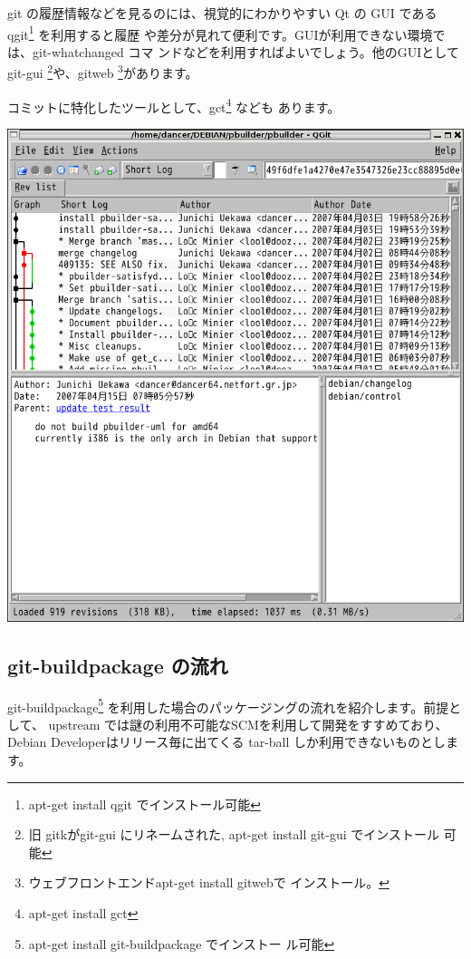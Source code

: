 \documentclass[mingoth,a4paper]{jsarticle}
\begin{document}
\begin{minipage}[b]{0.5\hsize}
git の履歴情報などを見るのには、視覚的にわかりやすい Qt の GUI である 
 qgit\footnote{apt-get install qgit でインストール可能} を利用すると履歴
 や差分が見れて便利です。GUIが利用できない環境では、git-whatchanged コマ
 ンドなどを利用すればよいでしょう。他のGUIとして git-gui \footnote{旧
 gitkがgit-gui にリネームされた, apt-get install git-gui でインストール
 可能}や、gitweb \footnote{ウェブフロントエンドapt-get install gitwebで
 インストール。}があります。

コミットに特化したツールとして、gct\footnote{apt-get install gct} なども
 あります。

\end{minipage}
\begin{minipage}[c]{0.5\hsize}
\includegraphics[width=0.8\hsize]{image200704/qgit.png}
\end{minipage}

\subsection{git-buildpackage の流れ}

git-buildpackage\footnote{apt-get install git-buildpackage でインストー
ル可能} を利用した場合のパッケージングの流れを紹介します。前提として、 
upstream では謎の利用不可能なSCMを利用して開発をすすめており、Debian
Developerはリリース毎に出てくる tar-ball しか利用できないものとします。
\end{document}
